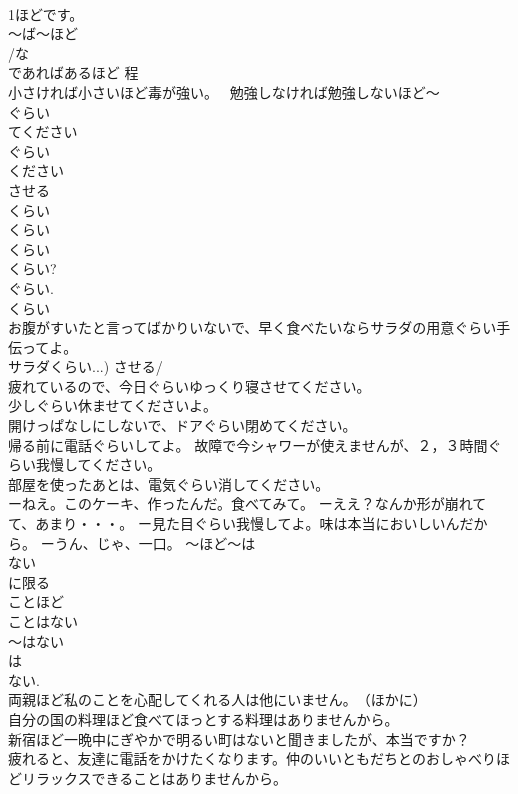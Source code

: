 \documentclass[8pt]{extreport}
\begin{document}
\begin{CJK}{UTF8}{min}
\\	1ほどです。 
\\	～ば～ほど 
\\	/な
\\	であればあるほど 程　
\\	小さければ小さいほど毒が強い。　 勉強しなければ勉強しないほど～ 
\\	ぐらい
\\	てください 
\\	ぐらい
\\	ください 
\\	させる 
\\	くらい
\\	くらい
\\	くらい
\\	くらい? 
\\	ぐらい. 
\\	くらい
\\	お腹がすいたと言ってばかりいないで、早く食べたいならサラダの用意ぐらい手伝ってよ。 
\\	サラダくらい...) させる/
\\	疲れているので、今日ぐらいゆっくり寝させてください。 
\\	少しぐらい休ませてくださいよ。 
\\	開けっぱなしにしないで、ドアぐらい閉めてください。 
\\	帰る前に電話ぐらいしてよ。 故障で今シャワーが使えませんが、２，３時間ぐらい我慢してください。 
\\	部屋を使ったあとは、電気ぐらい消してください。 
\\	ーねえ。このケーキ、作ったんだ。食べてみて。 ーええ？なんか形が崩れてて、あまり・・・。 ー見た目ぐらい我慢してよ。味は本当においしいんだから。 ーうん、じゃ、一口。 ～ほど～は
\\	ない 
\\	に限る 
\\	ことほど
\\	ことはない 
\\	～はない 
\\	は 
\\	ない. 
\\	両親ほど私のことを心配してくれる人は他にいません。　（ほかに） 
\\	自分の国の料理ほど食べてほっとする料理はありませんから。 
\\	新宿ほど一晩中にぎやかで明るい町はないと聞きましたが、本当ですか？ 
\\	疲れると、友達に電話をかけたくなります。仲のいいともだちとのおしゃべりほどリラックスできることはありませんから。 

\end{CJK}
\end{document}
